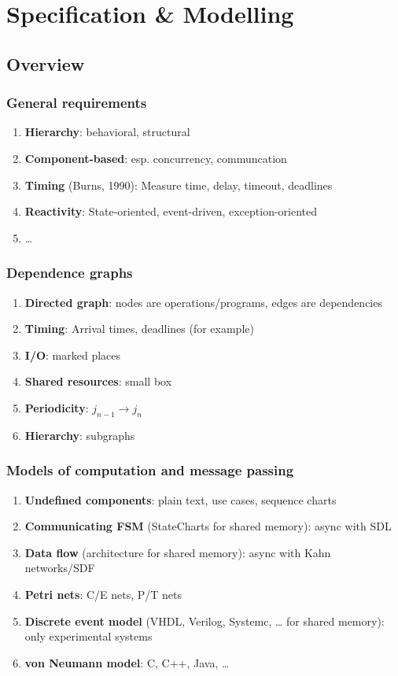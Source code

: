 \documentclass{article}
\author{Leopold Lemmermann}
\begin{document}
\createtitle

\section{Specification \& Modelling}

\subsection{Overview}
\subsubsection{General requirements}
\begin{enumerate}
  \item \textbf{Hierarchy}: behavioral, structural
  \item \textbf{Component-based}: esp. concurrency, communcation
  \item \textbf{Timing} (Burns, 1990): Measure time, delay, timeout, deadlines
  \item \textbf{Reactivity}: State-oriented, event-driven, exception-oriented
  \item …
\end{enumerate}

\subsubsection{Dependence graphs}
\begin{enumerate}
  \item \textbf{Directed graph}: nodes are operations/programs, edges are dependencies
  \item \textbf{Timing}: Arrival times, deadlines (for example)
  \item \textbf{I/O}: marked places
  \item \textbf{Shared resources}: small box
  \item \textbf{Periodicity}: $j_{n-1} \rightarrow j_n$
  \item \textbf{Hierarchy}: subgraphs
\end{enumerate}

\subsubsection{Models of computation and message passing}
\begin{enumerate}
  \item \textbf{Undefined components}: plain text, use cases, sequence charts
  \item \textbf{Communicating FSM} (StateCharts for shared memory): async with SDL
  \item \textbf{Data flow} (architecture for shared memory): async with Kahn networks/SDF
  \item \textbf{Petri nets}: C/E nets, P/T nets
  \item \textbf{Discrete event model} (VHDL, Verilog, Systemc, … for shared memory): only experimental systems
  \item \textbf{von Neumann model}: C, C++, Java, …
\end{enumerate}
\end{document}

